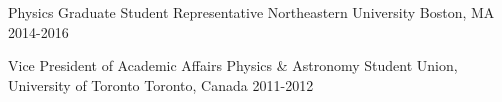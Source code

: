 \begin{cvhonors}
  \cvhonor
    {Physics Graduate Student Representative} %
    {Northeastern University} %
    {Boston, MA} %
    {2014-2016} %
    
    
    
  \cvhonor
    {Vice President of Academic Affairs} %
    {Physics \& Astronomy Student Union, University of Toronto} %
    {Toronto, Canada} %
    {2011-2012} %

\end{cvhonors}
